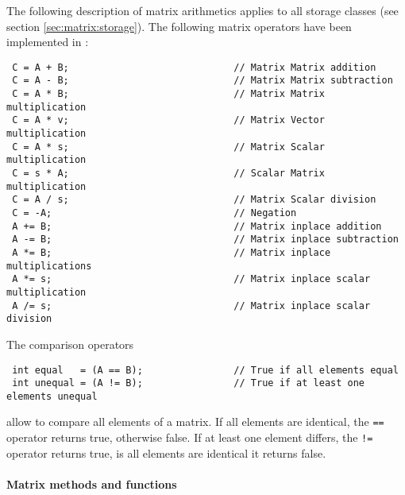 \documentclass{article}[12pt,a4]
\begin{document}
The following description of matrix arithmetics applies to all storage 
classes (see section \ref{sec:matrix:storage}).
The following matrix operators have been implemented in \this:
\begin{verbatim}
 C = A + B;                             // Matrix Matrix addition
 C = A - B;                             // Matrix Matrix subtraction
 C = A * B;                             // Matrix Matrix multiplication
 C = A * v;                             // Matrix Vector multiplication
 C = A * s;                             // Matrix Scalar multiplication
 C = s * A;                             // Scalar Matrix multiplication
 C = A / s;                             // Matrix Scalar division
 C = -A;                                // Negation
 A += B;                                // Matrix inplace addition
 A -= B;                                // Matrix inplace subtraction
 A *= B;                                // Matrix inplace multiplications
 A *= s;                                // Matrix inplace scalar multiplication
 A /= s;                                // Matrix inplace scalar division
\end{verbatim}
The comparison operators
\begin{verbatim}
 int equal   = (A == B);                // True if all elements equal
 int unequal = (A != B);                // True if at least one elements unequal
\end{verbatim}
allow to compare all elements of a matrix. 
If all elements are identical, the {\tt ==} operator returns true, 
otherwise false.
If at least one element differs, the {\tt !=} operator returns true, 
is all elements are identical it returns false.


\paragraph{Matrix methods and functions}
\end{document}
